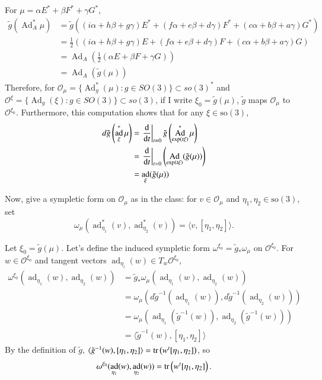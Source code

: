 \documentclass[a4paper, 12pt]{article}
\theoremstyle{Mydefinition}
\theoremstyle{Mytheorem}
\DeclareMathOperator{\Ad}{Ad}
\DeclareMathOperator{\ad}{ad}
\begin{document}
\begin{enumerate}
For $\mu = \alpha E^*+\beta F^*+\gamma G^*$,
\begin{equation*}
\begin{split}
    \tilde{g}\left(\Ad^*_A\mu\right) &= \tilde{g}\left((i\alpha+h\beta+g\gamma)E^*+(f\alpha+e\beta+d\gamma)F^*+(c\alpha+b\beta+a\gamma)G^*\right)\\
    &=\frac{1}{2}\left((i\alpha+h\beta+g\gamma)E+(f\alpha+e\beta+d\gamma)F+(c\alpha+b\beta+a\gamma)G\right)\\
    &=\Ad_A\left(\frac{1}{2}\left(\alpha E+\beta F+\gamma G\right)\right)\\
    &=\Ad_A(\tilde{g}(\mu))
\end{split}
\end{equation*}
Therefore, for $\mathcal{O}_\mu = \{\Ad_g^*(\mu):g\in \mathit{SO}(3)\}\subset \mathit{so}(3)^*$ and $\mathcal{O}^{\xi}=\{\Ad_g(\xi):g\in \mathit{SO}(3)\}\subset \mathit{so}(3)$, if I write $\xi_0 = \tilde{g}(\mu)$, $\tilde{g}$ maps $\mathcal{O}_\mu$ to $\mathcal{O}^{\xi_0}$. Furthermore, this computation shows that for any $\xi\in \mathrm{so}(3)$,
\begin{equation*}
\begin{split}
    d\tilde{g}\left(\ad_\xi^*\mu\right) &=\left.\dv{t}\right|_{t=0}\tilde{g}\left(\Ad_{\exp(t\xi)}^*\mu\right)\\
    &=\left.\dv{t}\right|_{t=0}\left(\Ad_{\exp(t\xi)}(\tilde{g}(\mu))\right)\\
    &=\ad_{\xi}(\tilde{g}(\mu))
\end{split}
\end{equation*}

Now, give a sympletic form on $\mathcal{O}_\mu$ as in the class: for $v\in \mathcal{O}_\mu$ and $\eta_1,\eta_2\in \mathrm{so}(3)$, set 
\begin{equation*}
    \omega_\mu (\ad^*_{\eta_1}(v), \ad^*_{\eta_2}(v)) = \langle v, [\eta_1, \eta_2]\rangle.
\end{equation*}

Let $\xi_0 = \tilde{g}(\mu)$. Let's define the induced sympletic form $\omega^{\xi_0} = \tilde{g}_*\omega_\mu$ on $\mathcal{O}^{\xi_0}$. For $w\in \mathcal{O}^{\xi_0}$ and tangent vectors $\ad_{\eta_i}(w)\in T_w\mathcal{O}^{\xi_0}$,
\begin{equation*}
\begin{split}
    \omega^{\xi_0}(\ad_{\eta_1}(w), \ad_{\eta_2}(w)) &= \tilde{g}_*\omega_\mu (\ad_{\eta_1}(w), \ad_{\eta_2}(w)) \\
    &= \omega_\mu (d\tilde{g}^{-1}\left(\ad_{\eta_1}(w)\right), d\tilde{g}^{-1}\left(\ad_{\eta_2}(w)\right))\\
    &=\omega_\mu (\ad_{\eta_1}(\tilde{g}^{-1}(w)), \ad_{\eta_2}(\tilde{g}^{-1}(w)))\\
    &=\langle \tilde{g}^{-1}(w), [\eta_1, \eta_2]\rangle
\end{split}
\end{equation*}
By the definition of $\tilde{g}$, $\langle \tilde{g}^{-1}(w), [\eta_1, \eta_2]\rangle = \tr\left(w^t[\eta_1, \eta_2]\right)$, so
\begin{equation*}
    \omega^{\xi_0}(\ad_{\eta_1}(w), \ad_{\eta_2}(w))=\tr\left(w^t[\eta_1, \eta_2]\right).
\end{equation*}


\end{enumerate}
\end{document}
